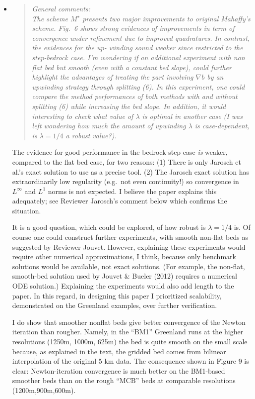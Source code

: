 \documentclass[11pt,reqno]{amsart}
\newcommand{\grad}{\nabla}
\newcommand{\reply}[2]{
\medskip\medskip
\item  \begin{quote}
\emph{#1}
\end{quote}

\medskip
\noindent #2}
\begin{document}
\begin{itemize}
\reply{General comments: \medskip \\
The scheme $M^\star$ presents two major improvements to original Mahaffy's scheme.
Fig.~6 shows strong evidences of improvements in term of convergence under
refinement due to improved quadratures. In contrast, the evidences for the up-
winding sound weaker since restricted to the step-bedrock case. I'm wondering
if an additional experiment with non flat bed but smooth (even with a constant
bed slope), could further highlight the advantages of treating the part involving
$\grad b$ by an upwinding strategy through splitting (6).  In this experiment, one could
compare the method performances of both methods with and without splitting
(6) while increasing the bed slope. In addition, it would interesting to check what
value of $\lambda$ is optimal in another case (I was left wondering how much the amount
of upwinding $\lambda$ is case-dependent, is $\lambda = 1/4$ a robust value?).}
{The evidence for good performance in the bedrock-step case \emph{is} weaker, compared to the flat bed case, for two reasons: (1) There is only Jarosch et al.'s exact solution to use as a precise tool.  (2) The Jarosch exact solution has extraordinarily low regularity (e.g.~not even continuity!) so convergence in $L^\infty$ and $L^1$ norms is not expected.  I believe the paper explains this adequately; see Reviewer Jarosch's comment below which confirms the situation.

It is a good question, which could be explored, of how robust is $\lambda=1/4$ is.  Of course one could construct further experiments, with smooth non-flat beds as suggested by Reviewer Jouvet.  However, explaining these experiments would require other numerical approximations, I think, because only benchmark solutions would be available, not exact solutions.  (For example, the non-flat, smooth-bed solution used by Jouvet \& Bueler (2012) requires a numerical ODE solution.)  Explaining the experiments would also add length to the paper.  In this regard, in designing this paper I prioritized scalability, demonstrated on the Greenland examples, over further verification.

I do show that smoother nonflat beds give better convergence of the Newton iteration than rougher.  Namely, in the ``BM1'' Greenland runs at the higher resolutions (1250m, 1000m, 625m) the bed is quite smooth on the small scale because, as explained in the text, the gridded bed comes from bilinear interpolation of the original 5 km data.  The consequence shown in Figure 9 is clear: Newton-iteration convergence is much better on the BM1-based smoother beds than on the rough ``MCB'' beds at comparable resolutions (1200m,900m,600m).}


\end{itemize}
\end{document}
